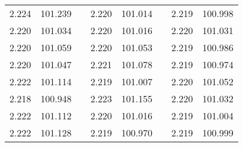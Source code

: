 \documentclass[12pt]{mwrep}
\begin{document}
\begin{table}[H]
\begin{tabularx}{\textwidth}{|Y|Y|p{2mm}|Y|Y|p{2mm}|Y|Y|}
			2.224 & 101.239 && 2.220 & 101.014 && 2.219 & 100.998 \\
			2.220 & 101.034 && 2.220 & 101.016 && 2.220 & 101.031 \\
			2.220 & 101.059 && 2.220 & 101.053 && 2.219 & 100.986 \\
			2.220 & 101.047 && 2.221 & 101.078 && 2.219 & 100.974 \\
			2.222 & 101.114 && 2.219 & 101.007 && 2.220 & 101.052 \\
			2.218 & 100.948 && 2.223 & 101.155 && 2.220 & 101.032 \\
			2.222 & 101.112 && 2.220 & 101.016 && 2.219 & 101.004 \\
			2.222 & 101.128 && 2.219 & 100.970 && 2.219 & 100.999 \\
		\end{tabularx}
	\end{table}
	
	
	
\end{document}
